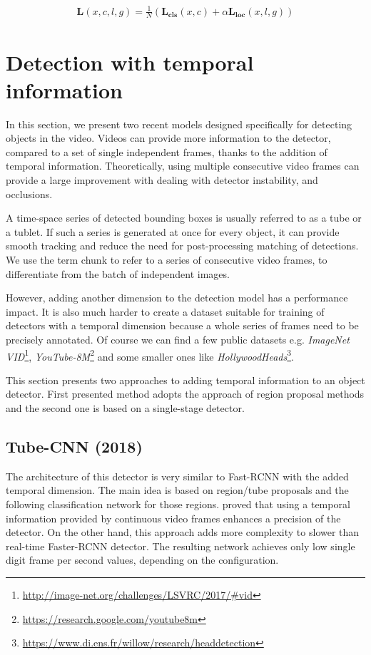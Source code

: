 \begin{align*}
\mathbf{L}(x,c,l,g) = \frac{1}{N}(\mathbf{L_{\text{cls}}}(x,c) + \alpha\mathbf{L_{\text{loc}}}(x,l,g))
\end{align*}

\section{Detection with temporal information}
\label{sec:video_det}
In this section, we present two recent models designed specifically for detecting objects in the video. Videos can provide more information to the detector, compared to a set of single independent frames, thanks to the addition of temporal information. Theoretically, using multiple consecutive video frames can provide a large improvement with dealing with detector instability, and occlusions. 

A time-space series of detected bounding boxes is usually referred to as a tube or a tublet. If such a series is generated at once for every object, it can provide smooth tracking and reduce the need for post-processing matching of detections. We use the term chunk to refer to a series of consecutive video frames, to differentiate from the batch of independent images.

However, adding another dimension to the detection model has a performance impact. It is also much harder to create a dataset suitable for training of detectors with a temporal dimension because a whole series of frames need to be precisely annotated. Of course we can find a few public datasets e.g. \textit{ImageNet VID}\footnote{\url{http://image-net.org/challenges/LSVRC/2017/\#vid}}, \textit{YouTube-8M}\footnote{\url{https://research.google.com/youtube8m}} and some smaller ones like \textit{HollywoodHeads}\footnote{\url{https://www.di.ens.fr/willow/research/headdetection}}.

This section presents two approaches to adding temporal information to an object detector. First presented method adopts the approach of region proposal methods and the second one is based on a single-stage detector.


\subsection{Tube-CNN (2018)}
\label{sed:tubecnn}
The architecture of this detector is very similar to Fast-RCNN with the added temporal dimension. The main idea is based on region/tube proposals and the following classification network for those regions. \citeauthor{bib:tubeCNN} \cite{bib:tubeCNN} proved that using a temporal information provided by continuous video frames enhances a precision of the detector. On the other hand, this approach adds more complexity to slower than real-time Faster-RCNN detector. The resulting network achieves only low single digit frame per second values, depending on the configuration. 

